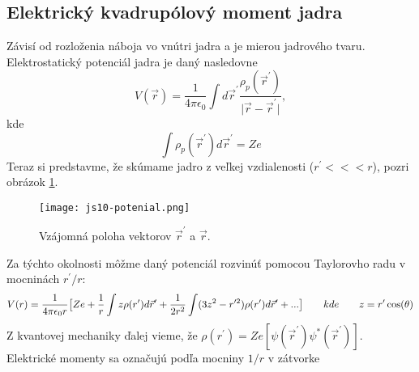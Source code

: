 \documentclass[../../main.tex]{subfiles}
\begin{document}
\subsection{Elektrický kvadrupólový moment jadra}
Závisí od rozloženia náboja vo vnútri jadra a je mierou jadrového tvaru. Elektrostatický potenciál jadra je daný nasledovne
\begin{equation}
V(\vec{r})=\frac{1}{4\pi\epsilon_0}\int d\vec{r}^{\prime}\frac{\rho_p({\vec{r}^{\prime}})}{\lvert \vec{r}-\vec{r}^{\prime} \rvert},
\end{equation}
kde 
\begin{equation}
\int \rho_p(\vec{r}^{\prime})d\vec{r}^{\prime}=Ze
\end{equation}
Teraz si predstavme, že skúmame jadro z veľkej vzdialenosti ($r^{\prime} <<< r$), pozri obrázok \ref{js10:potencial}. 
\begin{figure}
 \centerline{\texttt{[image: js10-potenial.png]}}
 \caption{Vzájomná poloha vektorov $\vec{r}^{\prime}$ a $\vec{r}$.}
 \label{js10:potencial}
\end{figure}
Za týchto okolnosti môžme daný potenciál rozvinúť pomocou Taylorovho radu v mocninách $r^{\prime}/r:$
\begin{equation}
V(r)=\frac{1}{4\pi\epsilon_0r} \big[ Ze+\frac{1}{r}\int z \rho(r^{\prime})d\vec{r}^{\prime}+\frac{1}{2r^2}\int(3z^2-r^{\prime2})\rho(r^{\prime})d\vec{r}^{\prime} +... \big] \hspace{0.7cm} kde \hspace{0.7cm} z=r^{\prime}\cos(\theta)
\end{equation}
Z kvantovej mechaniky ďalej vieme, že $ \rho(r^{\prime})=Ze [\psi(\vec{r}^{\prime})\psi^{*}(\vec{r}^{\prime})] $. Elektrické momenty sa označujú podľa mocniny $1/r$ v zátvorke
\end{document}

